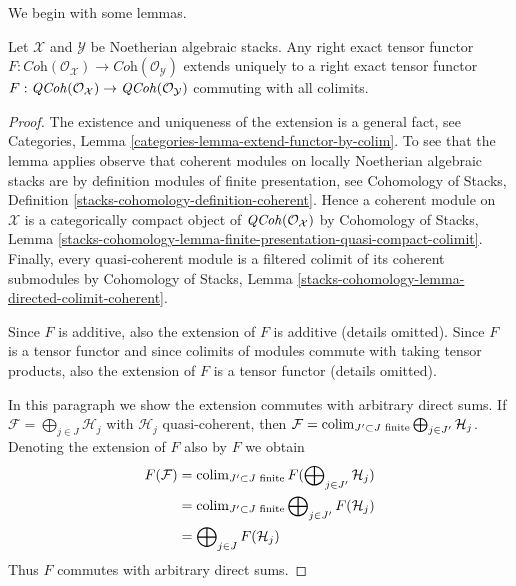 \medskip\noindent
We begin with some lemmas.

\begin{lemma}
\label{lemma-extend}
Let $\mathcal{X}$ and $\mathcal{Y}$ be Noetherian algebraic stacks.
Any right exact tensor functor $F : \textit{Coh}(\mathcal{O}_\mathcal{X}) \to
\textit{Coh}(\mathcal{O}_\mathcal{Y})$ extends uniquely to a
right exact tensor functor
$F : \mathit{QCoh}(\mathcal{O}_\mathcal{X}) \to \mathit{QCoh}(\mathcal{O}_\mathcal{Y})$
commuting with all colimits.
\end{lemma}

\begin{proof}
The existence and uniqueness of the extension is a general fact, see
Categories, Lemma \ref{categories-lemma-extend-functor-by-colim}.
To see that the lemma applies observe that coherent modules on
locally Noetherian algebraic stacks are by definition modules
of finite presentation, see
Cohomology of Stacks, Definition \ref{stacks-cohomology-definition-coherent}.
Hence a coherent module on $\mathcal{X}$ is a
categorically compact object of $\mathit{QCoh}(\mathcal{O}_\mathcal{X})$ by
Cohomology of Stacks, Lemma
\ref{stacks-cohomology-lemma-finite-presentation-quasi-compact-colimit}.
Finally, every quasi-coherent module is a filtered colimit of
its coherent submodules by Cohomology of Stacks, Lemma
\ref{stacks-cohomology-lemma-directed-colimit-coherent}.

\medskip\noindent
Since $F$ is additive, also the extension of $F$ is additive (details omitted).
Since $F$ is a tensor functor and since colimits of modules
commute with taking tensor products, also the extension of $F$
is a tensor functor (details omitted).

\medskip\noindent
In this paragraph we show the extension commutes with arbitrary
direct sums. If $\mathcal{F} = \bigoplus_{j \in J} \mathcal{H}_j$
with $\mathcal{H}_j$ quasi-coherent, then
$\mathcal{F} = \mathop{\mathrm{colim}}\nolimits_{J' \subset J\text{ finite}}
\bigoplus_{j \in J'} \mathcal{H}_j$.
Denoting the extension of $F$ also by $F$ we obtain
\begin{align*}
F(\mathcal{F})
& =
\mathop{\mathrm{colim}}\nolimits_{J' \subset J\text{ finite}}
F(\bigoplus\nolimits_{j \in J'} \mathcal{H}_j) \\
& =
\mathop{\mathrm{colim}}\nolimits_{J' \subset J\text{ finite}}
\bigoplus\nolimits_{j \in J'} F(\mathcal{H}_j) \\
& =
\bigoplus\nolimits_{j \in J} F(\mathcal{H}_j)
\end{align*}
Thus $F$ commutes with arbitrary direct sums.


\end{proof}

